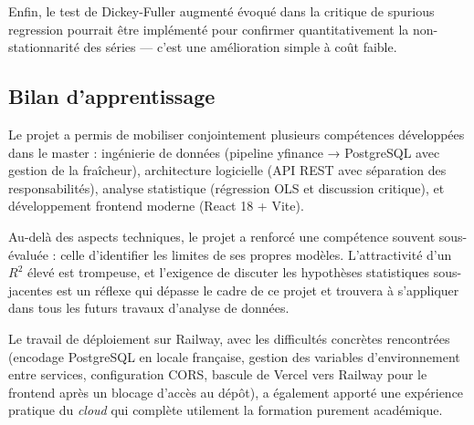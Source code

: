 \documentclass[11pt,a4paper]{article}
\begin{document}
Enfin, le test de Dickey-Fuller augmenté évoqué dans la critique de
spurious regression pourrait être implémenté pour confirmer
quantitativement la non-stationnarité des séries — c'est une
amélioration simple à coût faible.

\subsection{Bilan d'apprentissage}

Le projet a permis de mobiliser conjointement plusieurs compétences
développées dans le master : ingénierie de données (pipeline
yfinance → PostgreSQL avec gestion de la fraîcheur), architecture
logicielle (API REST avec séparation des responsabilités), analyse
statistique (régression OLS et discussion critique), et
développement frontend moderne (React 18 + Vite).

Au-delà des aspects techniques, le projet a renforcé une compétence
souvent sous-évaluée : celle d'identifier les limites de ses propres
modèles. L'attractivité d'un $R^2$ élevé est trompeuse, et l'exigence
de discuter les hypothèses statistiques sous-jacentes est un réflexe
qui dépasse le cadre de ce projet et trouvera à s'appliquer dans
tous les futurs travaux d'analyse de données.

Le travail de déploiement sur Railway, avec les difficultés concrètes
rencontrées (encodage PostgreSQL en locale française, gestion des
variables d'environnement entre services, configuration CORS, bascule
de Vercel vers Railway pour le frontend après un blocage d'accès au
dépôt), a également apporté une expérience pratique du \textit{cloud}
qui complète utilement la formation purement académique.
\end{document}
